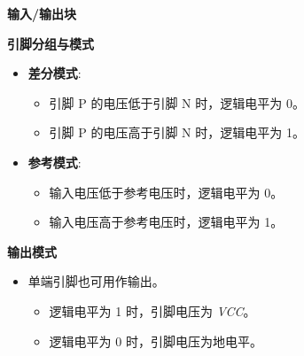 \documentclass[
  ignorenonframetext,
  chinese,
]{beamer}
\providecommand{\tightlist}{%
  \setlength{\itemsep}{0pt}\setlength{\parskip}{0pt}}
\begin{document}
\begin{frame}
\begin{block}{\textbf{输入/输出块}}
\begin{block}{\textbf{引脚分组与模式}}
\begin{itemize}
  \begin{itemize}
  \tightlist
  \item
    输入电压接近地电平时，逻辑电平为 0。
  \item
    输入电压接近 \emph{VCC} 时，逻辑电平为 1。
  \end{itemize}
\item
  \textbf{差分模式}:

  \begin{itemize}
  \tightlist
  \item
    引脚 P 的电压低于引脚 N 时，逻辑电平为 0。
  \item
    引脚 P 的电压高于引脚 N 时，逻辑电平为 1。
  \end{itemize}
\item
  \textbf{参考模式}:

  \begin{itemize}
  \tightlist
  \item
    输入电压低于参考电压时，逻辑电平为 0。
  \item
    输入电压高于参考电压时，逻辑电平为 1。
  \end{itemize}
\end{itemize}
\end{block}

\begin{block}{\textbf{输出模式}}
\label{ux8f93ux51faux6a21ux5f0f}
\begin{itemize}
\tightlist
\item
  单端引脚也可用作输出。

  \begin{itemize}
  \tightlist
  \item
    逻辑电平为 1 时，引脚电压为 \emph{VCC}。
  \item
    逻辑电平为 0 时，引脚电压为地电平。
  \end{itemize}
\end{itemize}
\end{block}
\end{block}
\end{frame}
\end{document}
